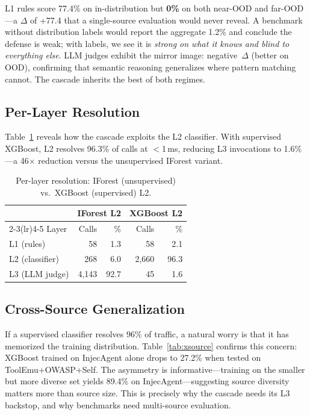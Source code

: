\documentclass[sigconf]{acmart}
\begin{document}
L1 rules score 77.4\% on in-distribution but \textbf{0\%} on both near-OOD and far-OOD---a $\Delta$ of +77.4 that a single-source evaluation would never reveal.
A benchmark without distribution labels would report the aggregate 1.2\% and conclude the defense is weak; with labels, we see it is \emph{strong on what it knows and blind to everything else}.
LLM judges exhibit the mirror image: negative~$\Delta$ (better on OOD), confirming that semantic reasoning generalizes where pattern matching cannot.
The cascade inherits the best of both regimes.

\subsection{Per-Layer Resolution}

Table~\ref{tab:perlayer} reveals how the cascade exploits the L2 classifier. With supervised XGBoost, L2 resolves 96.3\% of calls at $<$1\,ms, reducing L3 invocations to 1.6\%---a 46$\times$ reduction versus the unsupervised IForest variant.

\begin{table}[t]
\centering\small
\caption{Per-layer resolution: IForest (unsupervised) vs.\ XGBoost (supervised) L2.}
\vspace{-0.1in}
\label{tab:perlayer}
\begin{tabular}{lrrrr}
\toprule
 & \multicolumn{2}{c}{IForest L2} & \multicolumn{2}{c}{XGBoost L2} \\
\cmidrule(lr){2-3}\cmidrule(lr){4-5}
Layer & Calls & \% & Calls & \% \\
\midrule
L1 (rules) & 58 & 1.3 & 58 & 2.1 \\
L2 (classifier) & 268 & 6.0 & 2{,}660 & 96.3 \\
L3 (LLM judge) & 4{,}143 & 92.7 & 45 & 1.6 \\
\bottomrule
\end{tabular}
\vspace{-0.1in}
\end{table}

\subsection{Cross-Source Generalization}

If a supervised classifier resolves 96\% of traffic, a natural worry is that it has memorized the training distribution.
Table~\ref{tab:xsource} confirms this concern: XGBoost trained on InjecAgent alone drops to 27.2\% when tested on ToolEmu+OWASP+Self.
The asymmetry is informative---training on the smaller but more diverse set yields 89.4\% on InjecAgent---suggesting source diversity matters more than source size.
This is precisely why the cascade needs its L3 backstop, and why benchmarks need multi-source evaluation.
\end{document}
